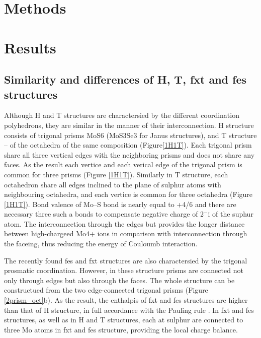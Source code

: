 \documentclass[a4paperm]{article}
\begin{document}
		\section{Methods}



			\section{Results}

\subsection{Similarity and differences of H, T, fxt and fes structures}

Although H and T structures are charactersied by the different coordination polyhedrons, they are similar in the manner of their interconnection.
H structure consists of trigonal prisms MoS6 (MoS3Se3 for Janus structures), and T structure – of the octahedra of the same composition (Figure\ref{1H1T}).
Each trigonal prism share all three vertical edges with the neighboring prisms and does not share any faces.
As the result each vertice and each verical edge of the trigonal prism is common for three prisms (Figure \ref{1H1T}).
Similarly in T structure, each octahedron share all edges inclined to the plane of sulphur atoms with neighbouring octahedra, and each vertice is common for three octahedra (Figure \ref{1H1T}).
Bond valence of Mo--S bond is nearly equal to +4/6 and there are necessary three such a bonds to compensate negative charge of 2$^-$i of the suphur atom.
The interconnection through the edges but provides the longer distance between high-chargeed Mo4+ ions in comparison with interconnection through the faceing, thus reducing the energy of Couloumb interaction.

The recently found fes and fxt structures are also charactersied by the trigonal prosmatic coordination.
However, in these structure prisms are connected not only through edges but also through the faces.
The whole structure can be constructued from the two edge-connected trigonal prisms (Figure \ref{2prism_oct}b).
As the result, the enthalpis of fxt and fes structures are higher than that of H structure, in full accordance with the Pauling rule \cite{Pauling1929}.
In fxt and fes structures, as well as in H and T structures, each at sulphur are connected to three Mo atoms in fxt and fes structure, providing the local charge balance.
\end{document}
